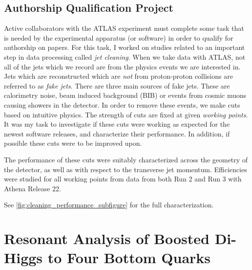 \documentclass[12pt]{article}
\begin{document}
\subsection{Authorship Qualification Project}
Active collaborators with the ATLAS experiment must complete some task that is
needed by the experimental apparatus (or software) in order to qualify for
authorship on papers. For this task, I worked on studies related to an important
step in data processing called \textit{jet cleaning}. When we take data with
ATLAS, not all of the jets which we record are from the physics events we are
interested in. Jets which are reconstructed which are \textit{not} from
proton-proton collisions are referred to as \textit{fake jets}. There are three
main sources of fake jets. These are calorimetry noise, beam induced background
(BIB) or events from cosmic muons causing showers in the detector. In order to
remove these events, we make cuts based on intuitive physics. The strength of
cuts are fixed at given \textit{working points}. It was my task to investigate
if these cuts were working as expected for the newest software releases, and
characterize their performance. In addition, if possible these cuts were to be
improved upon.

The performance of these cuts were suitably characterized across the geometry of
the detector, as well as with respect to the transverse jet momentum.
Efficiencies were studied for all working points from data from both Run 2 and
Run 3 with Athena Release 22.

See \ref{fig:cleaning_performance_subfigure} for the full characterization.
\newpage

\newpage
\section{Resonant Analysis of Boosted Di-Higgs to Four Bottom Quarks}
\end{document}
